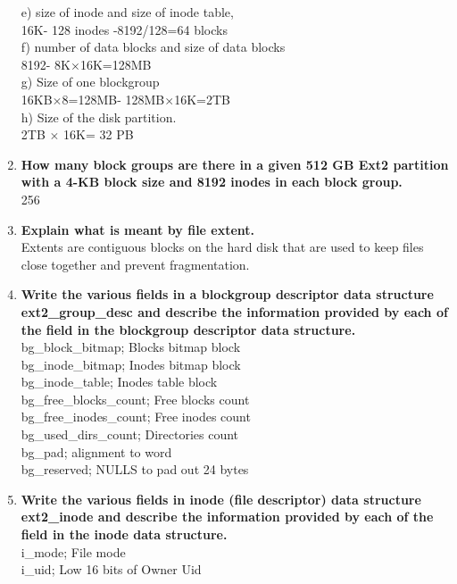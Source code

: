 \documentclass[a4paper,12pt]{article}
\begin{document}
\begin{flushleft}
\begin{enumerate}
e) size of inode and size of inode table,
\\{\color{red}16K- 128 inodes -8192/128=64 blocks }\\
f) number of data blocks and size of data blocks
\\{\color{red}8192- 8K$\times$16K=128MB}\\
g) Size of one blockgroup
\\{\color{red}16KB$\times$8=128MB- 128MB$\times$16K=2TB}\\
h) Size of the disk partition.
\\{\color{red}2TB $\times$ 16K= 32 PB}\\
\item \textbf{ How many block groups are there in a given 512 GB Ext2 partition with a 4-KB block size and 8192 inodes in each block group.}\\
{\color{red}256}\\
\item \textbf{ Explain what is meant by file extent.}\\
{\color{red}Extents are contiguous blocks on the hard disk that are used to keep files close together and prevent fragmentation.}\\
\item \textbf{ Write the various fields in a blockgroup descriptor data structure ext2\_group\_desc and describe the information provided by each of the field in the blockgroup descriptor data structure.}\\
{\color{red}
bg\_block\_bitmap;		 Blocks bitmap block 
\\bg\_inode\_bitmap;		 Inodes bitmap block 
\\bg\_inode\_table;		 Inodes table block 
\\bg\_free\_blocks\_count;	 Free blocks count 
\\bg\_free\_inodes\_count;	 Free inodes count 
\\bg\_used\_dirs\_count;	 Directories count 
\\bg\_pad;					alignment to word
\\bg\_reserved; NULLS to pad out 24 bytes}\\
\item \textbf{ Write the various fields in inode (file descriptor) data structure ext2\_inode and describe the information provided by each of the field in the inode data structure.}\\
{\color{red}
		i\_mode;		 File mode 
	\\	i\_uid;		 Low 16 bits of Owner Uid 
}
\end{enumerate}
\end{flushleft}
\end{document}
